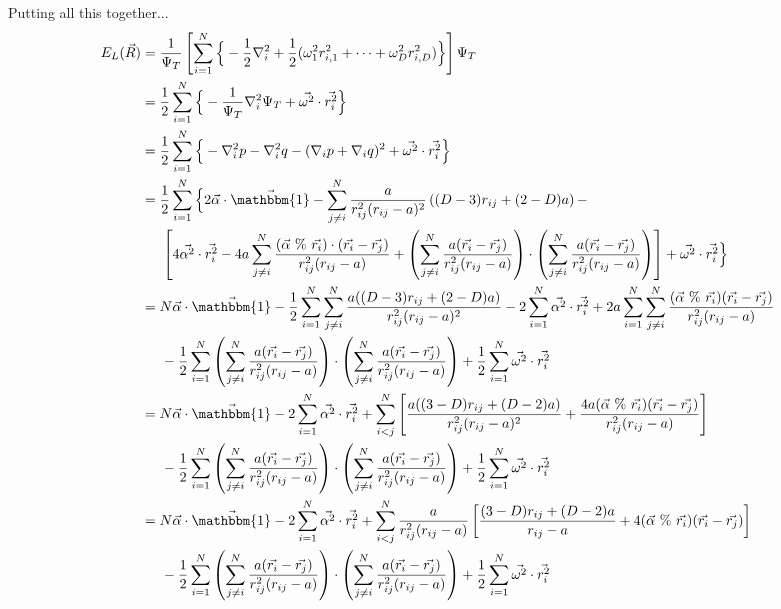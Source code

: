 \documentclass[12pt]{article}
\begin{document}
Putting all this together...
\begin{align*}
E_L(\vec{R}) &= \frac{1}{\Psi_T} 
\left[ \sum_{i=1}^N \Big\{ -\frac{1}{2}\nabla_i^2 + \frac{1}{2}(\omega_1^2r_{i,1}^2+\cdots+\omega_{D}^2r_{i,D}^2) \Big\} \right] \Psi_T \\
&= \frac{1}{2}  \sum_{i=1}^N \Big\{ -\frac{1}{\Psi_T} \nabla_i^2 \Psi_T + \vec{\omega^2} \cdot \vec{r_i^2}   \Big\}\\
&= \frac{1}{2} \sum_{i=1}^N \Big \{ - \nabla_i^2 p - \nabla_i^2 q - (\nabla_i p + \nabla_i q)^2 + \vec{\omega^2} \cdot \vec{r_i^2}   \Big\}\\
&= \frac{1}{2} \sum_{i=1}^N \Big \{ 2\vec{\alpha}\cdot \vec{\mathbbm{1}} - \sum_{j\neq i}^N \frac{a}{r_{ij}^2(r_{ij}-a)^2} \left( (D-3)r_{ij}+(2-D)a   \right) - \\
& \hspace*{5mm} \left[ 4 \vec{\alpha^2}\cdot\vec{r_i^2} - 4a \sum_{j\neq i}^N \frac{(\vec{\alpha} \ \% \ \vec{r_i}) \cdot (\vec{r_i}-\vec{r_j})}{r_{ij}^2(r_{ij}-a)} + \left( \sum_{j\neq i}^N \frac{a(\vec{r_i}-\vec{r_j})}{r_{ij}^2(r_{ij}-a)} \right) \cdot \left( \sum_{j\neq i}^N \frac{a(\vec{r_i}-\vec{r_j})}{r_{ij}^2(r_{ij}-a)} \right) \right] + \vec{\omega^2} \cdot \vec{r_i^2}   \Big\}\\
& = N\vec{\alpha}\cdot\vec{\mathbbm{1}} - \frac{1}{2}\sum_{i=1}^N \sum_{j\neq i}^N \frac{a((D-3)r_{ij}+(2-D)a)}{r_{ij}^2(r_{ij}-a)^2} - 2\sum_{i=1}^N \vec{\alpha^2}\cdot \vec{r_i^2} + 2a \sum_{i=1}^N \sum_{j \neq i}^N \frac{(\vec{\alpha} \ \% \ \vec{r_i})(\vec{r_i}-\vec{r_j})}{r_{ij}^2(r_{ij}-a)}\\
& \hspace*{5mm} -\frac{1}{2} \sum_{i=1}^N \left( \sum_{j\neq i}^N \frac{a(\vec{r_i}-\vec{r_j})}{r_{ij}^2(r_{ij}-a)} \right) \cdot \left( \sum_{j\neq i}^N \frac{a(\vec{r_i}-\vec{r_j})}{r_{ij}^2(r_{ij}-a)} \right) + \frac{1}{2}\sum_{i=1}^N \vec{\omega^2}\cdot \vec{r_i^2}\\
& = N\vec{\alpha}\cdot\vec{\mathbbm{1}} - 2\sum_{i=1}^N \vec{\alpha^2}\cdot \vec{r_i^2} 
+ \sum_{i<j}^N \left[ \frac{a((3-D)r_{ij}+(D-2)a)}{r_{ij}^2(r_{ij}-a)^2} + \frac{4a(\vec{\alpha} \ \% \ \vec{r_i})(\vec{r_i}-\vec{r_j})}{r_{ij}^2(r_{ij}-a)} \right]\\
& \hspace*{5mm} -\frac{1}{2} \sum_{i=1}^N \left( \sum_{j\neq i}^N \frac{a(\vec{r_i}-\vec{r_j})}{r_{ij}^2(r_{ij}-a)} \right) \cdot \left( \sum_{j\neq i}^N \frac{a(\vec{r_i}-\vec{r_j})}{r_{ij}^2(r_{ij}-a)} \right) + \frac{1}{2}\sum_{i=1}^N \vec{\omega^2}\cdot \vec{r_i^2}\\
& = N\vec{\alpha}\cdot\vec{\mathbbm{1}} - 2\sum_{i=1}^N \vec{\alpha^2}\cdot \vec{r_i^2} 
+ \sum_{i<j}^N \frac{a}{r_{ij}^2(r_{ij}-a)} \left[ 
\frac{(3-D)r_{ij}+(D-2)a}{r_{ij}-a} + 4(\vec{\alpha} \ \% \ \vec{r_i})(\vec{r_i}-\vec{r_j})
\right]\\
& \hspace*{5mm} -\frac{1}{2} \sum_{i=1}^N \left( \sum_{j\neq i}^N \frac{a(\vec{r_i}-\vec{r_j})}{r_{ij}^2(r_{ij}-a)} \right) \cdot \left( \sum_{j\neq i}^N \frac{a(\vec{r_i}-\vec{r_j})}{r_{ij}^2(r_{ij}-a)} \right) + \frac{1}{2}\sum_{i=1}^N \vec{\omega^2}\cdot \vec{r_i^2}\\
\end{align*}
\end{document}

